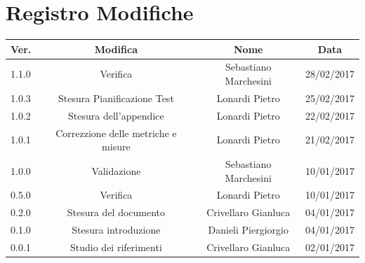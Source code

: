 \documentclass[12pt,a4paper,titlepage]{article}
\begin{document}
	
	
	\clearpage %
	
	
	\chead{}
	\cfoot{}
	\renewcommand{\headrulewidth}{0.2pt}
	\renewcommand{\footrulewidth}{0.2pt}
	
	\section{Registro Modifiche}
	\begin{center}
	\small %
	{\renewcommand\arraystretch{1.2} %
		\begin{tabular}{|l|c|c|c|}
			\hline
			{\textbf{Ver.}}&{\textbf{Modifica}}&{\textbf{Nome}}&{\textbf{Data}}\\
			\hline
			1.1.0 & Verifica & Sebastiano Marchesini & 28/02/2017 \\
			\hline
			1.0.3 & Stesura Pianificazione Test & Lonardi Pietro & 25/02/2017 \\
			\hline
			1.0.2 & Stesura dell'appendice & Lonardi Pietro & 22/02/2017 \\
			\hline
			1.0.1 & Correzzione delle metriche e misure & Lonardi Pietro & 21/02/2017 \\
			\hline
			1.0.0 & Validazione & Sebastiano Marchesini & 10/01/2017 \\
			\hline
			0.5.0 & Verifica & Lonardi Pietro & 10/01/2017 \\
			\hline
			0.2.0 & Stesura del documento & Crivellaro Gianluca & 04/01/2017 \\
			\hline
			0.1.0 & Stesura introduzione & Danieli Piergiorgio & 04/01/2017 \\
			\hline
			0.0.1 & Studio dei riferimenti & Crivellaro Gianluca & 02/01/2017 \\
			\hline
		\end{tabular}
	}
	\end{center}
	\normalsize
	
\end{document}
